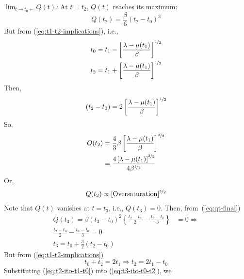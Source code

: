 \documentclass[12pt]{report}
\begin{document}
\vspace{1em}\noindent\emph{$\lim_{t\to t_0+} Q(t)$:}
At $t=t_2$, $Q(t)$ reaches its maximum:
\begin{equation}
  \label{eq:max-qt}
  Q(t_2) =\frac{\beta}{6}(t_2-t_0)^3
\end{equation}
But from (\ref{eq:t1-t2-implications}), i.e.,
\begin{equation*}
  \begin{split}
    t_0 & = t_1 - \left[\frac{\lambda-\mu(t_1)}{\beta}\right]^{\nicefrac{1}{2}}\\
    t_2 & = t_1  + \left[\frac{\lambda-\mu(t_1)}{\beta}\right]^{\nicefrac{1}{2}}
  \end{split}
\end{equation*}
Then,
\begin{equation}
  \label{eq:combined-t0-t2}
  (t_2-t_0) = 2\left[\frac{\lambda-\mu(t_1)}{\beta}\right]^{\nicefrac{1}{2}}
\end{equation}
So,
\begin{equation}
  \label{eq:q-t2}
  \begin{split}
    Q(t_2)& = \frac{4}{3}\beta\left[\frac{\lambda-\mu(t_1)}{\beta}\right]^{\nicefrac{3}{2}}\\
    & = \frac{4\left[\lambda-\mu(t_1)\right]^{\nicefrac{3}{2}}}{4\beta^{\nicefrac{1}{2}}} \\
  \end{split}
\end{equation}
Or,
\begin{equation}
  \label{eq:qt-prop-oversat}
  Q(t_2) \propto [\mathrm{Oversaturation}]^{\nicefrac{3}{2}}
\end{equation}
Note that $Q(t)$ vanishes at $t=t_3$, i.e., $Q(t_3)=0$.  Then, from~(\ref{eq:qt-final})
\begin{equation}
  \label{eq:t3-ito-t0-t2}
  \begin{split}
    Q(t_3) =\beta(t_3-t_0)^2\left\{\frac{t_2-t_0}{2}-\frac{t_3-t_0}{3}\right\} & = 0 \Rightarrow  \\
    \frac{t_2-t_0}{2}-\frac{t_3-t_0}{3} = 0 \\
    t_3 = t_0 + \frac{3}{2}(t_2-t_0)
  \end{split}
\end{equation}
But from (\ref{eq:t1-t2-implications})
\begin{equation}
  \label{eq:t2-ito-t1-t0}
  t_0 + t_2 = 2t_1 \Rightarrow t_2 = 2t_1 - t_0
\end{equation}
Substituting (\ref{eq:t2-ito-t1-t0}) into (\ref{eq:t3-ito-t0-t2}), we
\end{document}

